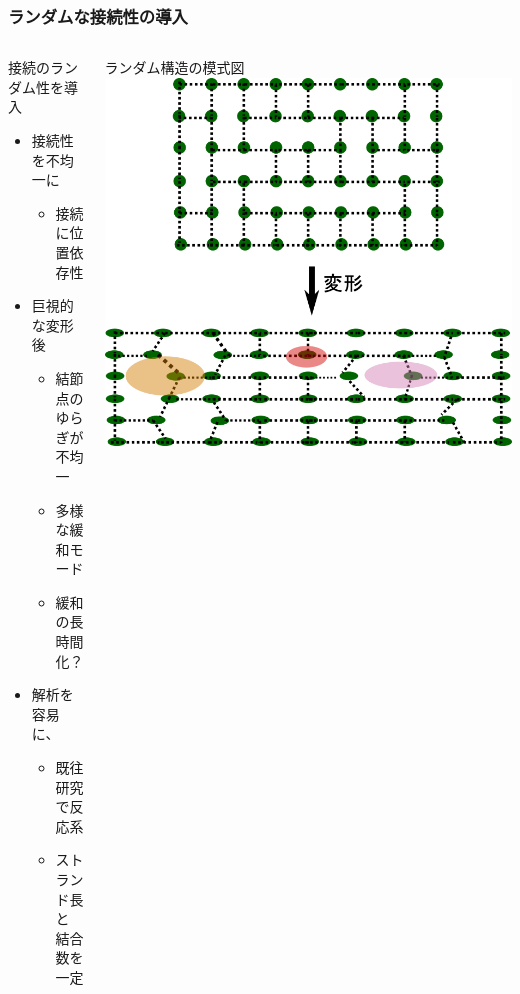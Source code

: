 \documentclass[12pt, dvipdfmx]{beamer}
\begin{document}
\begin{frame}
    \frametitle{ランダムな接続性の導入}
    \vspace{-3mm}
		\begin{columns}[totalwidth=1\textwidth]
				\begin{block}{接続のランダム性を導入}
					\begin{itemize}
						\item 接続性を不均一に
							\begin{itemize}
								\item 接続に\alert{位置依存性}
							\end{itemize}
						\item 巨視的な変形後
							\begin{itemize}
								\item 結節点のゆらぎが\\不均一
								\item 多様な緩和モード
								\item \alert{緩和の長時間化？}
							\end{itemize}
						\item \alert{解析を容易}に、
                            \begin{itemize}
                                \item 既往研究で反応系
								\item ストランド長と\\結合数を一定
							\end{itemize}
					\end{itemize}
				\end{block}
				ランダム構造の模式図
				\vspace{5mm}
				\includegraphics[width=\textwidth]{random_NW.png}
    \end{columns}
\end{frame}
\end{document}

